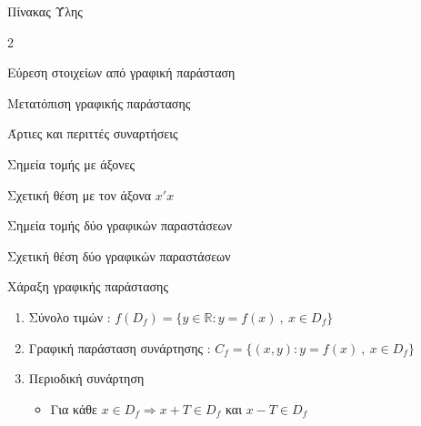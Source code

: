 \documentclass[twoside,nofonts,internet,math,spyros]{frontisthrio}
\begin{document}
\begin{mybox}[mysubtitle]{Πίνακας Ύλης}
\begin{multicols}{2}
\begin{todolist}[itemsep=0mm]
\item Εύρεση στοιχείων από γραφική παράσταση
\item Μετατόπιση γραφικής παράστασης
\item Άρτιες και περιττές συναρτήσεις
\item Σημεία τομής με άξονες
\item Σχετική θέση με τον άξονα $ x'x $
\item Σημεία τομής δύο γραφικών παραστάσεων
\item Σχετική θέση δύο γραφικών παραστάσεων
\item Χάραξη γραφικής παράστασης
\end{todolist}
\end{multicols}
\setlength{\columnseprule}{0pt}
\begin{enumerate}[itemsep=0mm,leftmargin=5mm]
\item Σύνολο τιμών : $ f(D_f)=\{y\in\mathbb{R}: y=f(x)\ ,\ x\in D_f\}$
\item Γραφική παράσταση συνάρτησης : $ C_f=\{ (x,y): y=f(x)\ ,\ x\in D_f \}$
\item Περιοδική συνάρτηση
\begin{itemize}[leftmargin=3mm]
\item Για κάθε $ x\in D_f\Rightarrow x+T\in D_f $ και $ x-T\in D_f $

\end{itemize}
\end{enumerate}
\end{mybox}
\end{document}
